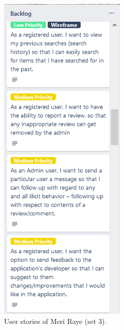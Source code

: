 \documentclass[11pt]{extarticle}
\begin{document}
\begin{center}
    \begin{figure}[H]
        \centering
        \includegraphics[width=2.4in]{Figures/user_stories_3.png}
        \caption{User stories of Meri Raye (set 3).}
    \end{figure}
\end{center}
\end{document}
